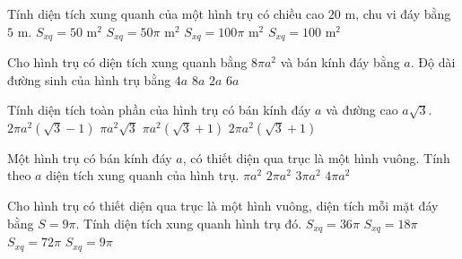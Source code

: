 \begin{ex}%
	Tính diện tích xung quanh của một hình trụ có chiều cao $20$ m, chu vi đáy bằng $5$ m.
	\choice
	{$S_{xq}= 50$ m$^2$}
	{$S_{xq}= 50\pi$ m$^2$}
	{$S_{xq}= 100\pi$ m$^2$}
	{\True $S_{xq}= 100$ m$^2$}
\end{ex}
\begin{ex}%
	Cho hình trụ có diện tích xung quanh bằng $8\pi a^2$ và bán kính đáy bằng $a$. Độ dài đường sinh của hình trụ bằng
	\choice
	{\True $4a$}
	{$8a$}
	{$2a$}
	{$6a$}
\end{ex}

\begin{ex}%
	Tính diện tích toàn phần của hình trụ có bán kính đáy $a$ và đường cao $a\sqrt 3$.
	\choice
	{$2\pi a^2\left(\sqrt{3}-1\right)$}
	{$\pi a^2\sqrt{3}$}
	{$\pi a^2\left(\sqrt{3}+1\right)$}
	{\True $2\pi a^2 \left(\sqrt{3}+1\right)$}
\end{ex}

\begin{ex}%
	Một hình trụ có bán kính đáy $a$, có thiết diện qua trục là một hình vuông. Tính theo $a$ diện tích xung quanh của hình trụ.
	\choice
	{$\pi a^2$}
	{$2\pi a^2$}
	{$3\pi a^2$}
	{\True $4\pi a^2$}
\end{ex}

\begin{ex}%
	Cho hình trụ có thiết diện qua trục là một hình vuông, diện tích mỗi mặt đáy bằng $S = 9\pi$. Tính diện tích xung quanh hình trụ đó.
	\choice
	{\True $S_{xq}=36\pi$}
	{$S_{xq}=18\pi$}
	{$S_{xq}=72\pi$}
	{$S_{xq}=9\pi$}
\end{ex}


